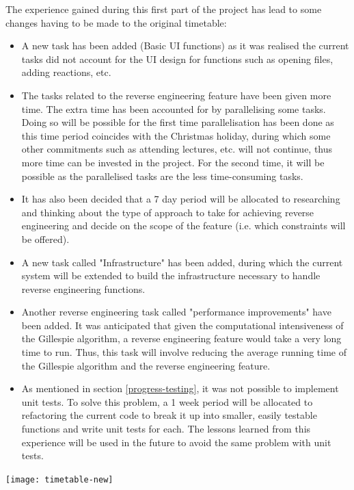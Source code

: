 \documentclass{article}
\begin{document}
		The experience gained during this first part of the project has lead to some changes having to be made to the original timetable:
	\begin{itemize}
		
		
		\item A new task has been added (Basic UI functions) as it was realised the current tasks did not account for the UI design for functions such as opening files, adding reactions, etc.
		
		\item The tasks related to the reverse engineering feature have been given more time. The extra time has been accounted for by parallelising some tasks. Doing so will be possible for the first time parallelisation has been done as this time period coincides with the Christmas holiday, during which some other commitments such as attending lectures, etc. will not continue, thus more time can be invested in the project. For the second time, it will be possible as the parallelised tasks are the less time-consuming tasks.
		\item It has also been decided that a 7 day period will be allocated to researching and thinking about the type of approach to take for achieving reverse engineering and decide on the scope of the feature (i.e. which constraints will be offered).
		\item A new task called "Infrastructure" has been added, during which the current system will be extended to build the infrastructure necessary to handle reverse engineering functions.
		\item Another reverse engineering task called "performance improvements" have been added. It was anticipated that given the computational intensiveness of the Gillespie algorithm, a reverse engineering feature would take a very long time to run. Thus, this task will involve reducing the average running time of the Gillespie algorithm and the reverse engineering feature.
		\item As mentioned in section \ref{progress-testing}, it was not possible to implement unit tests. To solve this problem, a 1 week period will be allocated to refactoring the current code to break it up into smaller, easily testable functions and write unit tests for each. The lessons learned from this experience will be used in the future to avoid the same problem with unit tests.
	\end{itemize}
	
	\texttt{[image: timetable-new]}
	
\end{document}
